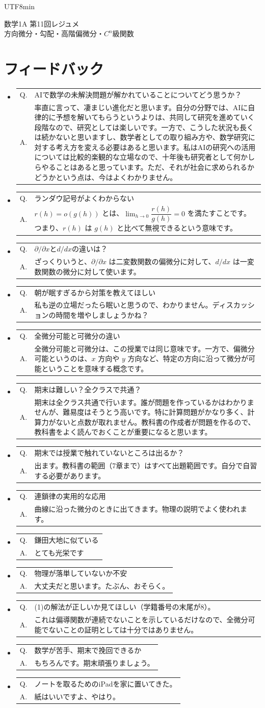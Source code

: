 \documentclass[a4paper,12pt]{article}
\makeatletter
\newcommand{\feedbackqa}[2]{%
\item[]
\begin{tabular}[t]{@{}p{1.8em}@{\hspace{0.4em}}p{\dimexpr\linewidth-2.2em\relax}@{}}
Q. & #1 \\
A. & #2
\end{tabular}
\par\smallskip\hrulefill
}
\makeatother
\begin{document}
\ifPDFTeX
\begin{CJK}{UTF8}{min}
\fi

\theoremstyle{definition}
\newtheorem*{definition}{定義}
\newtheorem*{theorem}{定理}
\newtheorem*{example}{例}
\newtheorem*{remark}{注意}
\renewcommand{\proofname}{\normalfont 証明}

\begin{center}
{\LARGE 数学1A 第11回レジュメ}\\[0.4em]
方向微分・勾配・高階偏微分・$C^n$級関数
\end{center}

\section*{フィードバック}

\begin{itemize}[leftmargin=1.5em,itemsep=0.7em,topsep=0.3em]
\feedbackqa{AIで数学の未解決問題が解かれていることについてどう思うか？}{率直に言って、凄まじい進化だと思います。自分の分野では、AIに自律的に予想を解いてもらうというよりは、共同して研究を進めていく段階なので、研究としては楽しいです。一方で、こうした状況も長くは続かないと思いますし、数学者としての取り組み方や、数学研究に対する考え方を変える必要はあると思います。私はAIの研究への活用については比較的楽観的な立場なので、十年後も研究者として何かしらやることはあると思っています。ただ、それが社会に求められるかどうかという点は、今はよくわかりません。}
\feedbackqa{ランダウ記号がよくわからない}{$r(h)=o(g(h))$ とは、$\lim_{h\to0}\dfrac{r(h)}{g(h)}=0$ を満たすことです。つまり、$r(h)$ は $g(h)$ と比べて無視できるという意味です。}
\feedbackqa{$\partial/\partial x$と$d/dx$の違いは？}{ざっくりいうと、$\partial/\partial x$ は二変数関数の偏微分に対して、$d/dx$ は一変数関数の微分に対して使います。}
\feedbackqa{朝が眠すぎるから対策を教えてほしい}{私も逆の立場だったら眠いと思うので、わかりません。ディスカッションの時間を増やしましょうかね？}
\feedbackqa{全微分可能と可微分の違い}{全微分可能と可微分は、この授業では同じ意味です。一方で、偏微分可能というのは、$x$ 方向や $y$ 方向など、特定の方向に沿って微分が可能ということを意味する概念です。}
\feedbackqa{期末は難しい？全クラスで共通？}{期末は全クラス共通で行います。誰が問題を作っているかはわかりませんが、難易度はそうとう高いです。特に計算問題がかなり多く、計算力がないと点数が取れません。教科書の作成者が問題を作るので、教科書をよく読んでおくことが重要になると思います。}
\feedbackqa{期末では授業で触れていないところは出るか？}{出ます。教科書の範囲（7章まで）はすべて出題範囲です。自分で自習する必要があります。}
\feedbackqa{連鎖律の実用的な応用}{曲線に沿った微分のときに出てきます。物理の説明でよく使われます。}
\feedbackqa{鎌田大地に似ている}{とても光栄です}
\feedbackqa{物理が落単していないか不安}{大丈夫だと思います。たぶん、おそらく。}
\feedbackqa{(1)の解法が正しいか見てほしい（学籍番号の末尾が8）。}{これは偏導関数が連続でないことを示しているだけなので、全微分可能でないことの証明としては十分ではありません。}
\feedbackqa{数学が苦手、期末で挽回できるか}{もちろんです。期末頑張りましょう。}
\feedbackqa{ノートを取るためのiPadを家に置いてきた。}{紙はいいですよ、やはり。}
  \end{itemize}




\end{CJK}
\end{document}
